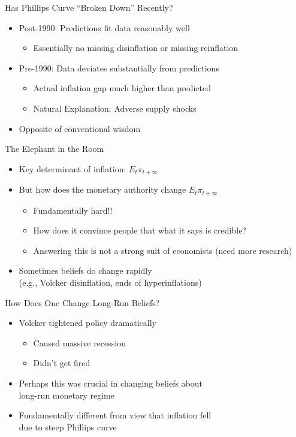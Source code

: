 \documentclass[10pt]{beamer}
\begin{document}
\begin{frame}{Has Phillips Curve ``Broken Down'' Recently?}
	\begin{itemize}
		\itemsep1em 
		\item Post-1990: Predictions fit data reasonably well
		\begin{itemize}
			\item Essentially no missing disinflation or missing reinflation
		\end{itemize}
		\item Pre-1990: Data deviates substantially from predictions
		\begin{itemize}
			\item Actual inflation gap much higher than predicted
			\item Natural Explanation: Adverse supply shocks 
		\end{itemize}
		\item Opposite of conventional wisdom
	\end{itemize}
\end{frame}



\begin{frame}{The Elephant in the Room}
	\begin{itemize}
		\itemsep1em 
		\item Key determinant of inflation: $E_t \pi_{t+\infty}$
		\item But how does the monetary authority change $E_t \pi_{t+\infty}$ 
		\begin{itemize}
			\item Fundamentally hard!!
			\item How does it convince people that what it says is credible?
			\item Answering this is not a strong suit of economists (need more research)
		\end{itemize}
		\item Sometimes beliefs do change rapidly \\ (e.g., Volcker disinflation, ends of hyperinflations)
	\end{itemize}
\end{frame}

\begin{frame}{How Does One Change Long-Run Beliefs?}
	\begin{itemize}
		\itemsep1em 
		\item Volcker tightened policy dramatically
		\begin{itemize}
			\item Caused massive recession
			\item Didn't get fired 
		\end{itemize}
		\item Perhaps this was crucial in changing beliefs about \\ long-run monetary regime
		\item Fundamentally different from view that inflation fell \\ due to steep Phillips curve	
	\end{itemize}
\end{frame}
\end{document}

